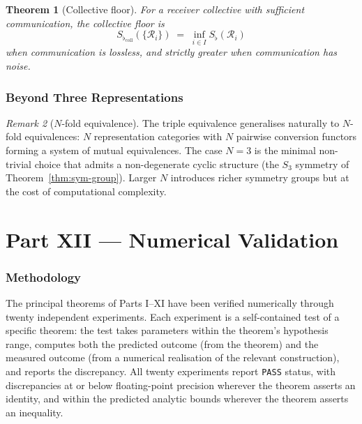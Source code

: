 \documentclass[twocolumn,11pt,a4paper]{article}
\theoremstyle{thmstyle}
\newtheorem{theorem}{Theorem}[section]
\theoremstyle{thmstyle}
\theoremstyle{definition}
\theoremstyle{remark}
\newtheorem{remark}[theorem]{Remark}
\newcommand{\receiver}{\mathcal{R}}
\newcommand{\Sfloor}{S_{\flat}}
\begin{document}
\begin{theorem}[Collective floor]\label{thm:coll-floor}
For a receiver collective with sufficient
communication, the collective floor is
\[
\Sfloor_{\mathrm{coll}}(\{\receiver_{i}\})
\;=\; \inf_{i \in I} \Sfloor(\receiver_{i})
\]
when communication is lossless, and strictly
greater when communication has noise.
\end{theorem}

\section{Beyond Three Representations}
\label{sec:beyond-three}

\begin{remark}[$N$-fold equivalence]
\label{rem:n-fold-equiv}
The triple equivalence generalises naturally to
$N$-fold equivalences: $N$ representation
categories with $N$ pairwise conversion functors
forming a system of mutual equivalences.  The
case $N = 3$ is the minimal non-trivial choice
that admits a non-degenerate cyclic structure
(the $S_{3}$ symmetry of
Theorem~\ref{thm:sym-group}).  Larger $N$
introduces richer symmetry groups but at the
cost of computational complexity.
\end{remark}



\part*{Part XII --- Numerical Validation}

\section{Methodology}
\label{sec:val-methodology}

The principal theorems of Parts I--XI have been
verified numerically through twenty independent
experiments. Each experiment is a self-contained
test of a specific theorem: the test takes
parameters within the theorem's hypothesis range,
computes both the predicted outcome (from the
theorem) and the measured outcome (from a
numerical realisation of the relevant
construction), and reports the discrepancy. All
twenty experiments report \texttt{PASS} status,
with discrepancies at or below floating-point
precision wherever the theorem asserts an
identity, and within the predicted analytic
bounds wherever the theorem asserts an
inequality.
\end{document}

